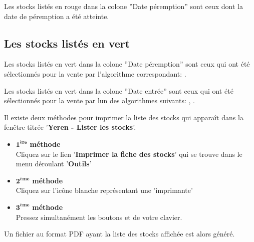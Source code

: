 Les stocks list\'es en \textcolor{firebrickred}{rouge} dans
la colone ''Date p\'eremption'' sont ceux dont la date de
p\'eremption a \'et\'e atteinte.

\subsection{Les stocks list\'es en vert}
Les stocks list\'es en \textcolor{medgreen}{vert} dans la
colone ''Date p\'eremption'' sont ceux qui ont \'et\'e
s\'electionn\'es pour la vente par l'algorithme correspondant:
\dpfdpo.

Les stocks list\'es en \textcolor{medgreen}{vert} dans la
colone ''Date entr\'ee'' sont ceux qui ont \'et\'e
s\'electionn\'es pour la vente par lun des algorithmes
suivants: \fifo, \lifo.


\newpage
{}\label{sec:imprimer-liste-stocks}

Il existe deux m\'ethodes pour imprimer la liste des
stocks qui appara\^it dans la fen\^etre titr\'ee
'\textbf{Yeren - Lister les stocks}'.

\begin{itemize}[]
	\item \textcolor{purplish}{$\mathbf{1^{\text{\`ere}}}$ \textbf{m\'ethode}}\\
		Cliquez sur le lien '\textbf{Imprimer la fiche des stocks}'
		qui se trouve dans le menu d\'eroulant '\textbf{Outils}'\\

	\item \textcolor{purplish}{$\mathbf{2^{\text{\`eme}}}$ \textbf{m\'ethode}}\\
		Cliquez sur l'ic\^one blanche repr\'esentant
		une 'imprimante'\\

	\item \textcolor{purplish}{$\mathbf{3^{\text{\`eme}}}$ \textbf{m\'ethode}}\\
		Pressez simultan\'ement les boutons 
		et  de votre clavier.\\
\end{itemize}

Un fichier au format PDF ayant la liste des stocks affich\'ee
est alors g\'en\'er\'e.

{}

